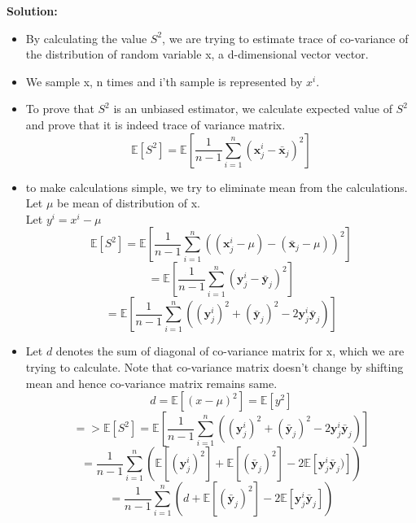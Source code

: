 \documentclass[twoside,10pt]{article}
\begin{document}
\textbf{Solution:}\\
\begin{itemize}
	\item By calculating the value $S^2$, we are trying to estimate trace of co-variance of the distribution of random variable x, a d-dimensional vector vector. 
    \item We sample x, n times and i'th sample is represented by $x^i$. 
    \item To prove that $S^2$ is an unbiased estimator, we calculate expected value of $S^2$ and prove that it is indeed trace of variance matrix.
    $$\mathbb{E}[S^2] =\mathbb{E}[\frac{1}{n-1} \sum_{i=1}^{n}(\textbf{x}_j^i - \bar{\textbf{x}}_j)^2] $$
    \item to make calculations simple, we try to eliminate mean from the calculations. Let $\mu$ be mean of distribution of x. \\
    Let $y^i = x^i - \mu$
    $$\mathbb{E}[S^2] =\mathbb{E}[\frac{1}{n-1} \sum_{i=1}^{n}((\textbf{x}_j^i - \mu) - (\bar{\textbf{x}}_j - \mu))^2 ] $$
    $$=\mathbb{E}[\frac{1}{n-1} \sum_{i=1}^{n}(\textbf{y}_j^i  - \bar{\textbf{y}}_j )^2 ] $$
    $$=\mathbb{E}[\frac{1}{n-1} \sum_{i=1}^{n}((\textbf{y}_j^i)^2  + (\bar{\textbf{y}}_j )^2 - 2 \textbf{y}_j^i \bar{\textbf{y}}_j ) ] $$
    \item Let $d$ denotes the sum of diagonal of co-variance matrix for x, which we are trying to calculate. Note that co-variance matrix doesn't change by shifting mean and hence co-variance matrix remains same.
    $$d = \mathbb{E}[(x-\mu)^2] = \mathbb{E}[y^2]$$
    $$=> \mathbb{E}[S^2] = \mathbb{E}[\frac{1}{n-1} \sum_{i=1}^{n}((\textbf{y}_j^i)^2  + (\bar{\textbf{y}}_j )^2 - 2 \textbf{y}_j^i \bar{\textbf{y}}_j ) ] $$
     $$=\frac{1}{n-1} \sum_{i=1}^{n}(\mathbb{E}[(\textbf{y}_j^i)^2]  + \mathbb{E}[(\bar{\textbf{y}}_j )^2] - 2 \mathbb{E}[\textbf{y}_j^i \bar{\textbf{y}}_j )])  $$
     $$=\frac{1}{n-1} \sum_{i=1}^{n}(d + \mathbb{E}[(\bar{\textbf{y}}_j )^2] - 2 \mathbb{E}[\textbf{y}_j^i \bar{\textbf{y}}_j ])  $$
     

\end{itemize}
\end{document}
